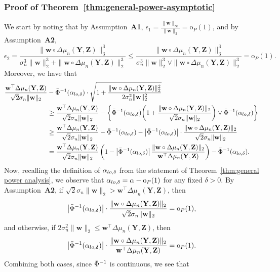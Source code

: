 \documentclass[12pt]{article}
\newcommand{\bY}{\mathbf{Y}}
\newcommand{\bZ}{\mathbf{Z}}
\newcommand{\bw}{\mathbf{w}}
\begin{document}
\subsubsection{Proof of Theorem~\ref{thm:general-power-asymptotic}}
    We start by noting that by Assumption~\textbf{A1}, $\epsilon_1 = \frac{\|\bw\|_\infty}{\|\bw\|_2}=\mathrm{o}_P(1)$, and by Assumption~\textbf{A2}, 
\[
\epsilon_2=\frac{\|\bw\circ\Delta\mu_n(\bY,\bZ)\|^3_3}{\sigma_n^3\|\bw\|^3_2 + \|\bw\circ\Delta\mu_n(\bY,\bZ)\|^3_2}\leq \frac{\|\bw\circ\Delta\mu_n(\bY,\bZ)\|^3_3}{\sigma_n^3\|\bw\|^3_2 \vee \|\bw\circ\Delta\mu_n(\bY,\bZ)\|^3_2}=\mathrm{o}_P(1).
\]
Moreover, we have that
\begin{align*}
    \frac{\bw^\top\Delta\mu_n(\bY,\bZ)}{\sqrt{2}\sigma_n\|\bw\|_2} &-  \bar\Phi^{-1}(\alpha_{\rm{lo},\delta}) \cdot\sqrt{1 +\frac{ \|\bw\circ\Delta\mu_n(\bY,\bZ)\|^2_2}{2\sigma_n^2\|\bw\|^2_2}} \\
    &\geq \frac{\bw^\top\Delta\mu_n(\bY,\bZ)}{\sqrt{2}\sigma_n\|\bw\|_2} -  \biggl\{\bar\Phi^{-1}(\alpha_{\rm{lo},\delta})\biggl(1 +\frac{ \|\bw\circ\Delta\mu_n(\bY,\bZ)\|_2}{\sqrt{2}\sigma_n\|\bw\|_2}\biggr)\vee  \bar\Phi^{-1}(\alpha_{\rm{lo},\delta})\biggr\}\\
    &\geq \frac{\bw^\top\Delta\mu_n(\bY,\bZ)}{\sqrt{2}\sigma_n\|\bw\|_2}-\bar\Phi^{-1}(\alpha_{\rm{lo},\delta})-\bigl|\bar\Phi^{-1}(\alpha_{\rm{lo},\delta}) \bigr|\cdot \frac{ \|\bw\circ\Delta\mu_n(\bY,\bZ)\|_2}{\sqrt{2}\sigma_n\|\bw\|_2}\\
    &= \frac{\bw^\top\Delta\mu_n(\bY,\bZ)}{\sqrt{2}\sigma_n\|\bw\|_2}\left(1-\left|\bar\Phi^{-1}(\alpha_{\rm{lo},\delta})\right|\frac{ \|\bw\circ\Delta\mu_n(\bY,\bZ)\|_2}{\bw^\top\Delta\mu_n(\bY,\bZ)}\right)-\bar\Phi^{-1}(\alpha_{\rm{lo},\delta}).
\end{align*}
Now, recalling the definition of $\alpha_{\rm{lo},\delta}$ from the statement of Theorem~\ref{thm:general power analysis}, we observe that $\alpha_{\rm{lo},\delta}=\alpha -\mathrm{o}_P(1)$ for any fixed $\delta > 0$. By Assumption~\textbf{A2}, if $\sqrt{2}\sigma_n\|\bw\|_2 > \bw^\top\Delta\mu_n(\bY,\bZ)$, then
\[
\bigl|\bar\Phi^{-1}(\alpha_{\rm{lo},\delta})\bigr| \cdot\frac{ \|\bw\circ\Delta\mu_n(\bY,\bZ)\|_2}{\sqrt{2}\sigma_n\|\bw\|_2} =\mathrm{o}_P(1),
\]
and otherwise, if $2\sigma_n^2\|\bw\|_2\leq\bw^\top\Delta\mu_n(\bY,\bZ)$, then
\[
\bigl|\bar\Phi^{-1}(\alpha_{\rm{lo},\delta})\bigr|\cdot \frac{ \|\bw\circ\Delta\mu_n(\bY,\bZ)\|_2}{\bw^\top\Delta\mu_n(\bY,\bZ)}=\mathrm{o}_P(1).
\]
Combining both cases, since $\Bar{\Phi}^{-1}$ is continuous, we see that 
\end{document}
